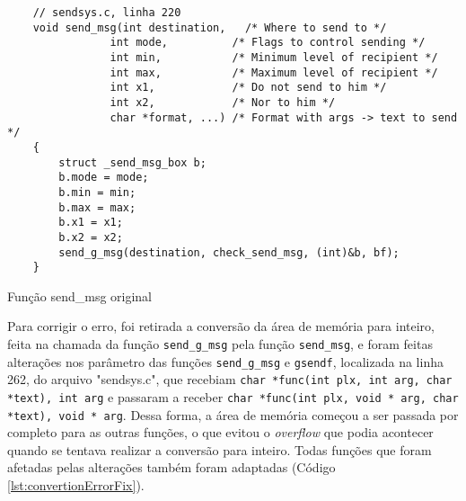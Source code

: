 \begin{listing}[!ht]
    \begin{verbatim}
    // sendsys.c, linha 220
    void send_msg(int destination,   /* Where to send to */
                int mode,          /* Flags to control sending */
                int min,           /* Minimum level of recipient */
                int max,           /* Maximum level of recipient */
                int x1,            /* Do not send to him */
                int x2,            /* Nor to him */
                char *format, ...) /* Format with args -> text to send */
    {
        struct _send_msg_box b;
        b.mode = mode;
        b.min = min;
        b.max = max;
        b.x1 = x1;
        b.x2 = x2;
        send_g_msg(destination, check_send_msg, (int)&b, bf);
    }
    \end{verbatim}
\caption{Função send\_msg original}
\label{lst:sendMsgOri}
\end{listing}

Para corrigir o erro, foi retirada a conversão da área de memória para inteiro, feita na chamada da função 
\verb|send_g_msg| pela função \verb|send_msg|, e foram feitas alterações nos parâmetro das funções 
\verb|send_g_msg| e \verb|gsendf|, localizada na linha 262, do arquivo "sendsys.c", que recebiam 
\verb|char *func(int plx, int arg, char *text), int arg| e passaram a receber 
\verb|char *func(int plx, void * arg, char *text), void * arg|. Dessa forma, a área de memória começou a 
ser passada por completo para as outras funções, o que evitou o \textit{overflow} que podia acontecer quando 
se tentava realizar a conversão para inteiro. Todas funções que foram afetadas pelas alterações também 
foram adaptadas (Código \ref{lst:convertionErrorFix}).

